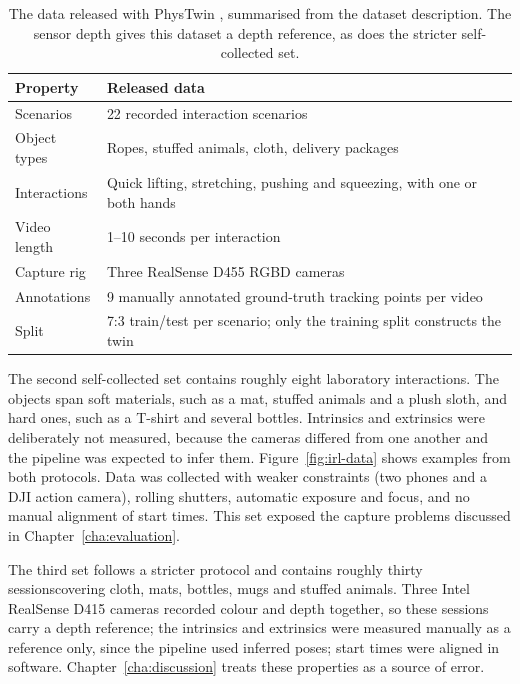 \begin{table}[H]
	\caption{The data released with PhysTwin \parencite{phystwin}, summarised from the dataset
	description. The sensor depth gives this dataset a depth reference, as does the stricter
	self-collected set.}
	\label{tab:phystwin-data}
	\begin{center}
		\begin{tabular}{@{}p{3.6cm}p{10.4cm}@{}}
			\toprule
			Property & Released data \\
			\midrule
			Scenarios & 22 recorded interaction scenarios \\
			Object types & Ropes, stuffed animals, cloth, delivery packages \\
			Interactions & Quick lifting, stretching, pushing and squeezing, with one or both hands \\
			Video length & 1--10 seconds per interaction \\
			Capture rig & Three RealSense D455 RGBD cameras \\
			Annotations & 9 manually annotated ground-truth tracking points per video \\
			Split & 7:3 train/test per scenario; only the training split constructs the twin \\
			\bottomrule
		\end{tabular}
	\end{center}
\end{table}

The second self-collected set contains roughly eight laboratory interactions. The objects span soft
materials, such as a mat, stuffed animals and a plush sloth, and hard ones, such as a T-shirt and
several bottles. Intrinsics and extrinsics were deliberately not measured, because the cameras
differed from one another and the pipeline was expected to infer them. Figure~\ref{fig:irl-data} shows examples from both protocols. Data was collected with weaker constraints (two phones and a DJI action camera), rolling shutters, automatic exposure and focus, and no manual alignment of start times. This set exposed the capture
problems discussed in Chapter~\ref{cha:evaluation}.

The third set follows a stricter protocol and contains roughly thirty sessionscovering cloth, mats, bottles, mugs and stuffed animals. Three Intel RealSense D415 cameras recorded colour and
depth together, so these sessions carry a depth reference; the intrinsics and extrinsics were
measured manually as a reference only, since the pipeline used inferred poses; start times were aligned in software. Chapter~\ref{cha:discussion} treats
these properties as a source of error.

